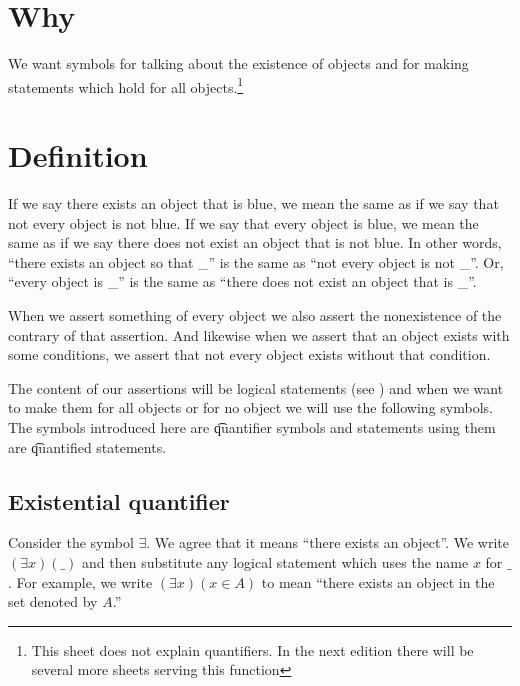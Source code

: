

\section*{Why}

We want symbols for talking about the existence of objects and for making statements which hold for all objects.\footnote{This sheet does not explain quantifiers. In the next edition there will be several more sheets serving this function}

\section*{Definition}

If we say there exists an object that is blue, we mean the same as if we say that not every object is not blue.
If we say that every object is blue, we mean the same as if we say there does not exist an object that is not blue.
In other words, ``there exists an object so that \_'' is the same as ``not every object is not \_''.
Or, ``every object is \_'' is the same as ``there does not exist an object that is \_''.

When we assert something of every object we also assert the nonexistence of the contrary of that assertion.
And likewise when we assert that an object exists with some conditions, we assert that not every object exists without that condition.

The content of our assertions will be logical statements (see ) and when we want to make them for all objects or for no object we will use the following symbols.
The symbols introduced here are \t{quantifier symbols} and statements using them are \t{quantified statements}.

\subsection*{Existential quantifier}

Consider the symbol $\exists $.
We agree that it means ``there exists an object''.
We write $(\exists x)(\_)$ and then substitute any logical statement which uses the name $x$ for $\_$ .
For example, we write $(\exists x)(x \in A)$ to mean ``there exists an object in the set denoted by $A$.''
%  

